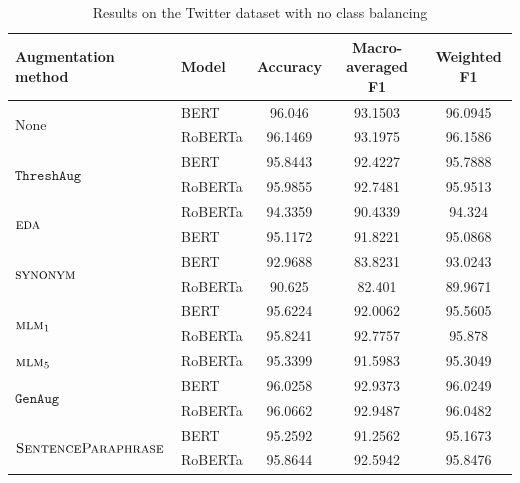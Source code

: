 \documentclass[11pt,a4paper]{article}
\newcommand{\noaug}{$\textrm{None}$}
\newcommand{\senttfpara}{$\textsc{SentenceParaphrase}$}
\newcommand{\eda}{$\textsc{eda}$}
\newcommand{\synonym}{$\textsc{synonym}$}
\newcommand{\mlmone}{$\textsc{mlm}_1$}
\newcommand{\mlmfive}{$\textsc{mlm}_5$}
\newcommand{\genaug}{$\texttt{GenAug}$}
\newcommand{\threshaug}{$\texttt{ThreshAug}$}
\begin{document}
\begin{table}[]
    \small
    \centering
    \begin{tabular}{llccc}
        \toprule
        \textbf{Augmentation method} & \textbf{Model} & \textbf{Accuracy} & \textbf{Macro-averaged F1} & \textbf{Weighted F1} \\
        \midrule
        \multirow{2}{*}{\noaug} & BERT & 96.046 & 93.1503 & 96.0945 \\
         & RoBERTa & 96.1469 & 93.1975 & 96.1586 \\\midrule
         
        \multirow{2}{*}{\threshaug} & BERT & 95.8443 & 92.4227 & 95.7888 \\
         & RoBERTa & 95.9855 & 92.7481 & 95.9513 \\\cmidrule{2-5}
        \multirow{2}{*}{\eda} & RoBERTa & 94.3359 & 90.4339 & 94.324 \\
         & BERT & 95.1172 & 91.8221 & 95.0868 \\\midrule

        \multirow{2}{*}{\synonym} & BERT & 92.9688 & 83.8231 & 93.0243 \\
         & RoBERTa & 90.625 & 82.401 & 89.9671 \\\cmidrule{2-5}
        \multirow{2}{*}{\mlmone} & BERT & 95.6224 & 92.0062 & 95.5605 \\
         & RoBERTa & 95.8241 & 92.7757 & 95.878 \\\cmidrule{2-5}
        \mlmfive & RoBERTa & 95.3399 & 91.5983 & 95.3049 \\\midrule
         
        \multirow{2}{*}{\genaug} & BERT & 96.0258 & 92.9373 & 96.0249\\
         & RoBERTa & 96.0662 & 92.9487 & 96.0482 \\\midrule
        
        \multirow{2}{*}{\senttfpara} & BERT & 95.2592 & 91.2562 & 95.1673 \\
         & RoBERTa & 95.8644 & 92.5942 & 95.8476 \\
        \bottomrule
    \end{tabular}
    \caption{Results on the Twitter dataset with no class balancing}
    \label{tab:twitter0}
\end{table}
\end{document}
